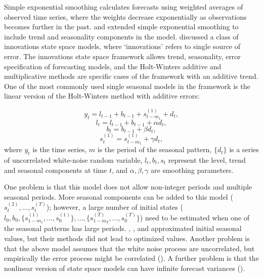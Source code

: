 \documentclass{uwstat572}
\begin{document}
Simple exponential smoothing calculates forecasts using weighted averages of observed time series, where the weights decrease exponentially as observations becomes further in the past. \citet{holt1957forecasting} and \citet{winters1960forecasting} extended simple exponential smoothing to include trend and seasonality components in the model. \citet{hyndman2002state} discussed a class of innovations state space models, where `innovations' refers to single source of error. The innovations state space framework allows trend, seasonality, error specification of forecasting models, and the Holt-Winters additive and multiplicative methods are specific cases of the framework with an additive trend. One of the most commonly used single seasonal models in the framework is the linear version of the Holt-Winters method with additive errors:

\begin{equation}
y_t=l_{t-1}+b_{t-1}+s_{t-m_1}^{(1)}+d_t,
\end{equation}
\begin{equation}
l_t=l_{t-1}+b_{t-1}+\alpha d_t,
\end{equation}
\begin{equation}
b_t=b_{t-1}+\beta d_t,
\end{equation}
\begin{equation}
s_t^{(1)}=s_{t-m_1}^{(1)}+\gamma d_t,
\end{equation}
where $y_t$ is the time series, $m$ is the period of the seasonal pattern, $\{d_t\}$ is a series of uncorrelated white-noise random variable, $l_t, b_t, s_t$ represent the level, trend and seasonal components at time $t$, and $\alpha,\beta,\gamma$ are smoothing parameters.

One problem is that this model does not allow non-integer periods and multiple seasonal periods. More seasonal components can be added to this model ($s_t^{(2)},...,s_t^{(T)}$); however, a large number of initial states ($l_0, b_0, \{ s^{(1)}_{1-m_1}, ..., s_0^{(1)} \},...,  \{ s^{(T)}_{1-m_T}, ..., s_0^{(T)} \}$) need to be estimated when one of the seasonal patterns has large periods. \citet{taylor2003short}, \citet{taylor2010triple}, and \citet{gould2008forecasting} approximated initial seasonal values, but their methods did not lead to optimized values. Another problem is that the above model assumes that the white noise process are uncorrelated, but empirically the error process might be correlated (\citet{taylor2003short}). A further problem is that the nonlinear version of state space models can have infinite forecast variances (\citet{akram2009exponential}). 
\end{document}
